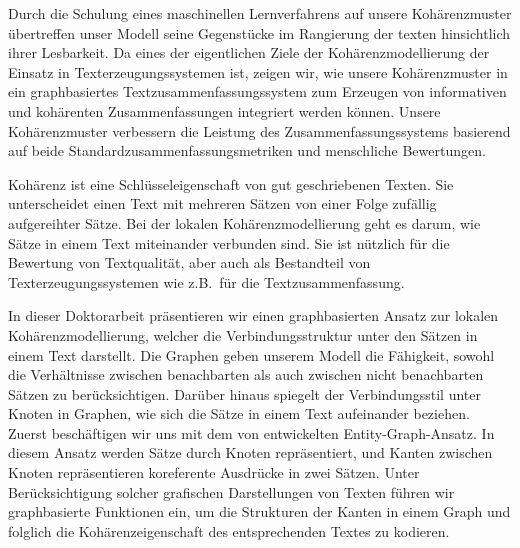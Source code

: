 Durch die Schulung eines maschinellen Lernverfahrens auf unsere Kohärenzmuster übertreffen unser Modell seine Gegenstücke im Rangierung der texten hinsichtlich ihrer Lesbarkeit. 
Da eines der eigentlichen Ziele der Kohärenzmodellierung der Einsatz in Texterzeugungssystemen ist, zeigen wir, wie unsere Kohärenzmuster in ein graphbasiertes Textzusammenfassungssystem zum Erzeugen von informativen und kohärenten Zusammenfassungen integriert werden können. 
Unsere Kohärenzmuster verbessern die Leistung des Zusammenfassungssystems basierend auf beide Standardzusammenfassungsmetriken und menschliche Bewertungen.

Kohärenz ist eine Schlüsseleigenschaft von gut geschriebenen Texten. 
Sie unterscheidet einen Text mit mehreren Sätzen von einer Folge zufällig aufgereihter Sätze. 
Bei der lokalen Kohärenzmodellierung geht es darum, wie Sätze in einem Text miteinander verbunden sind. 
Sie ist nützlich für die Bewertung von Textqualität, aber auch als Bestandteil von Texterzeugungssystemen wie z.B.\ für die Textzusammenfassung. 

In dieser Doktorarbeit präsentieren wir einen graphbasierten Ansatz zur lokalen Kohärenzmodellierung, welcher die Verbindungsstruktur unter den Sätzen in einem Text darstellt. 
Die Graphen geben unserem Modell die Fähigkeit, sowohl die Verhältnisse zwischen benachbarten als auch zwischen nicht benachbarten Sätzen zu berücksichtigen. 
Darüber hinaus spiegelt der Verbindungsstil unter Knoten in Graphen, wie sich die Sätze in einem Text aufeinander beziehen. 
Zuerst beschäftigen wir uns mit dem von  entwickelten \mbox{Entity-Graph-Ansatz}. 
In diesem Ansatz werden Sätze durch Knoten repräsentiert, und Kanten zwischen Knoten repräsentieren koreferente Ausdrücke in zwei Sätzen. 
Unter Berücksichtigung solcher grafischen Darstellungen von Texten führen wir graphbasierte Funktionen ein, um die Strukturen der Kanten in einem Graph und folglich die Kohärenzeigenschaft des entsprechenden Textes zu kodieren. 

